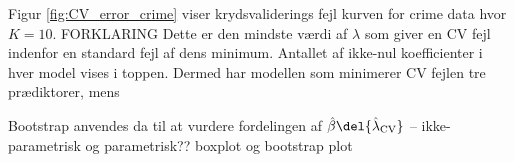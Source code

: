 %
Figur \ref{fig:CV_error_crime} viser krydsvaliderings fejl kurven for crime data hvor \(K=10\). FORKLARING
Dette er den mindste værdi af \(\lambda\) som giver en CV fejl indenfor en standard fejl af dens minimum.
Antallet af ikke-nul koefficienter i hver model vises i toppen.
Dermed har modellen som minimerer CV fejlen tre prædiktorer, mens 

Bootstrap anvendes da til at vurdere fordelingen af \(\hat{\beta} \del{\hat{\lambda}_{\text{CV}}}\) -- ikke-parametrisk og parametrisk??
boxplot og bootstrap plot

 